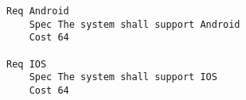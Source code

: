 

\begin{lstlisting}
Req Android
	Spec The system shall support Android
	Cost 64

Req IOS
	Spec The system shall support IOS
	Cost 64

\end{lstlisting}
